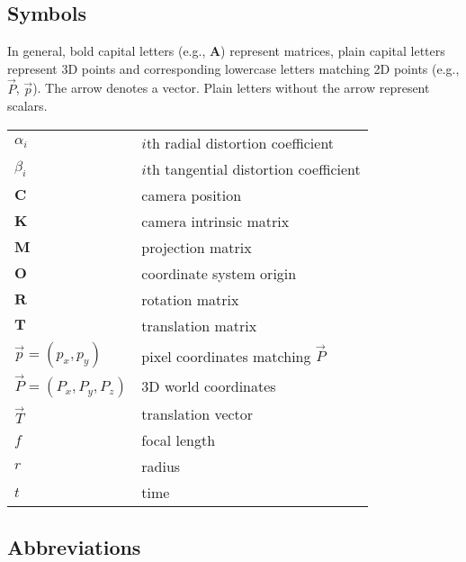 
\subsection*{Symbols}

In general, bold capital letters (e.g., $\bm A$) represent matrices, plain capital letters represent 3D points and corresponding lowercase letters matching 2D points (e.g., $\vec P$, $\vec p$).
The arrow denotes a vector.
Plain letters without the arrow represent scalars.

\begin{tabular}{ll}
	$\alpha_i$ & $i$th radial distortion coefficient\\
	$\beta_i$ & $i$th tangential distortion coefficient\\
	$\bm C$ & camera position\\
	$\bm K$ & camera intrinsic matrix\\
	$\bm M$ & projection matrix\\
	$\bm O$ & coordinate system origin\\
	$\bm R$ & rotation matrix\\
	$\bm T$ & translation matrix\\
	$\vec p = (p_x, p_y)$ & pixel coordinates matching $\vec P$\\
	$\vec P = (P_x, P_y, P_z)$ & 3D world coordinates\\
	$\vec T$ & translation vector\\
	$f$ & focal length\\
	$r$ & radius\\
	$t$ & time\\
\end{tabular}
%
%

\subsection*{Abbreviations}

